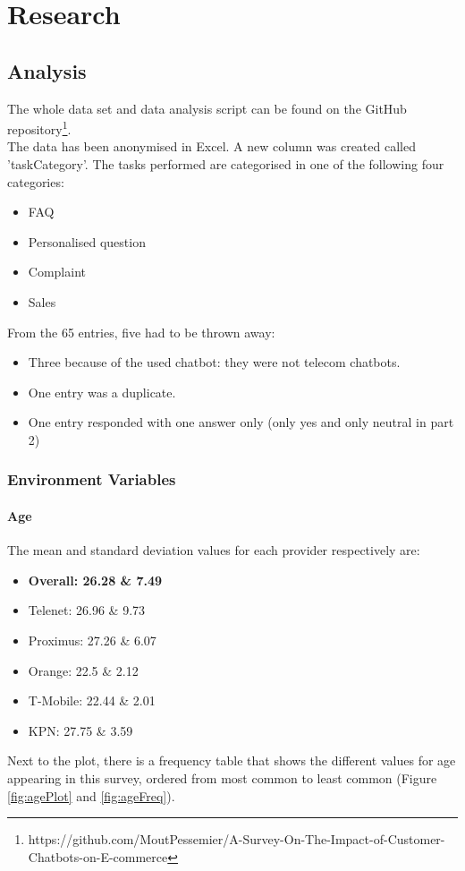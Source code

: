 \mainmatter
\pagestyle{headings}
\chapter{Research}
\label{ch:research}

\section{Analysis}
The whole data set and data analysis script can be found on the GitHub repository\footnote{https://github.com/MoutPessemier/A-Survey-On-The-Impact-of-Customer-Chatbots-on-E-commerce}.\\
\break
The data has been anonymised in Excel. A new column was created called 'taskCategory'. The tasks performed are categorised in one of the following four categories:
\begin{itemize}
	\setlength\itemsep{-0.1em}
	\item FAQ
	\item Personalised question
	\item Complaint
	\item Sales
\end{itemize}
From the 65 entries, five had to be thrown away:
\begin{itemize}
	\setlength\itemsep{-0.1em}
	\item Three because of the used chatbot: they were not telecom chatbots.
	\item One entry was a duplicate.
	\item One entry responded with one answer only (only yes and only neutral in part 2)
\end{itemize}

\subsection{Environment Variables}
\subsubsection{Age}
The mean and standard deviation values for each provider respectively are:
\begin{itemize}
	\setlength\itemsep{-0.1em}
	\item \textbf{Overall: 26.28 \& 7.49}
	\item Telenet: 26.96 \& 9.73
	\item Proximus: 27.26 \& 6.07
	\item Orange: 22.5 \& 2.12
	\item T-Mobile: 22.44 \& 2.01
	\item KPN: 27.75 \& 3.59
\end{itemize}
Next to the plot, there is a frequency table that shows the different values for age appearing in this survey, ordered from most common to least common (Figure \ref{fig:agePlot} and \ref{fig:ageFreq}).

